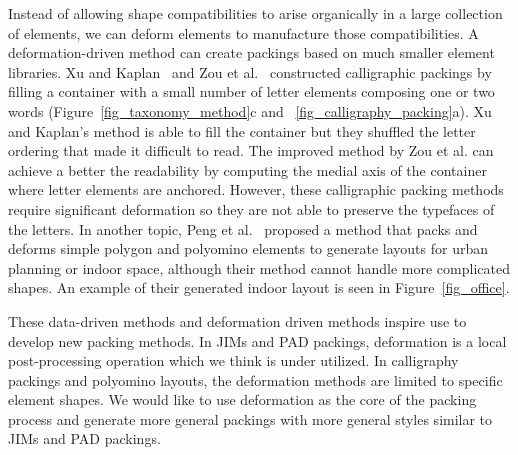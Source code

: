 \nnewtext
{
Instead of allowing shape compatibilities to arise organically in a large collection of elements, 
we can deform elements to manufacture those compatibilities.
A deformation-driven method can create packings based on much smaller element libraries.
Xu and Kaplan~\cite{Xu2007} and Zou et al.~\cite{Zou2016} constructed calligraphic packings by filling a container with a small
number of letter elements composing one or two words (Figure~\ref{fig_taxonomy_method}c and ~\ref{fig_calligraphy_packing}a). 
Xu and Kaplan's method is able to fill the container but they shuffled the letter ordering that made it difficult to read.
The improved method by Zou et al. can achieve a better the readability by computing
the medial axis of the container where letter elements are anchored.
However, these calligraphic packing methods require significant deformation 
so they are not able to preserve the typefaces of the letters.
In another topic, Peng et al.~\cite{Peng2014} proposed a method that packs and deforms
simple polygon and polyomino elements to generate layouts for urban planning or indoor space, 
although their method cannot handle more complicated shapes. 
An example of their generated indoor layout is seen in Figure~\ref{fig_office}.
}


\nnewtext
{
These data-driven methods and deformation driven methods inspire use to develop new packing methods.
In JIMs and PAD packings, deformation is a local post-processing operation which we think is under utilized.
In calligraphy packings and polyomino layouts, the deformation methods are limited to specific element shapes.
We would like to use deformation as the core of the packing process and generate more general packings
with more general styles similar to JIMs and PAD packings.
}




